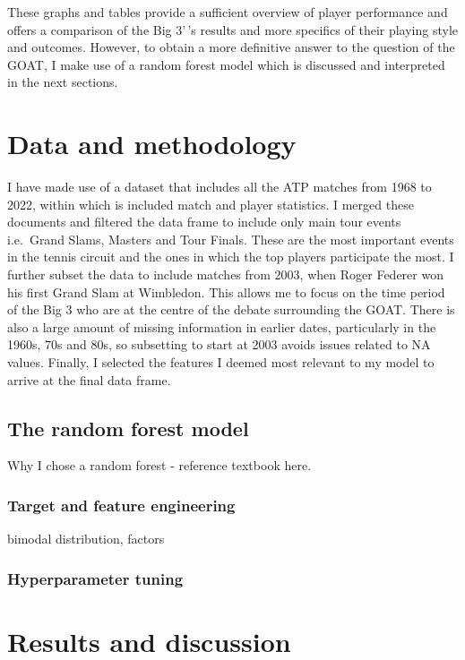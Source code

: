 \documentclass[11pt,preprint, authoryear]{elsarticle}
\numberwithin{equation}{section}
\numberwithin{figure}{section}
\numberwithin{table}{section}
\begin{document}
These graphs and tables provide a sufficient overview of player
performance and offers a comparison of the Big 3'\,'s results and more
specifics of their playing style and outcomes. However, to obtain a more
definitive answer to the question of the GOAT, I make use of a random
forest model which is discussed and interpreted in the next sections.

\hypertarget{data-and-methodology}{%
\section{Data and methodology}\label{data-and-methodology}}

I have made use of a dataset that includes all the ATP matches from 1968
to 2022, within which is included match and player statistics. I merged
these documents and filtered the data frame to include only main tour
events i.e.~Grand Slams, Masters and Tour Finals. These are the most
important events in the tennis circuit and the ones in which the top
players participate the most. I further subset the data to include
matches from 2003, when Roger Federer won his first Grand Slam at
Wimbledon. This allows me to focus on the time period of the Big 3 who
are at the centre of the debate surrounding the GOAT. There is also a
large amount of missing information in earlier dates, particularly in
the 1960s, 70s and 80s, so subsetting to start at 2003 avoids issues
related to NA values. Finally, I selected the features I deemed most
relevant to my model to arrive at the final data frame.

\hypertarget{the-random-forest-model}{%
\subsection{The random forest model}\label{the-random-forest-model}}

Why I chose a random forest - reference textbook here.

\hypertarget{target-and-feature-engineering}{%
\subsubsection{Target and feature
engineering}\label{target-and-feature-engineering}}

bimodal distribution, factors

\hypertarget{hyperparameter-tuning}{%
\subsubsection{Hyperparameter tuning}\label{hyperparameter-tuning}}

\hypertarget{results-and-discussion}{%
\section{Results and discussion}\label{results-and-discussion}}


\end{document}
